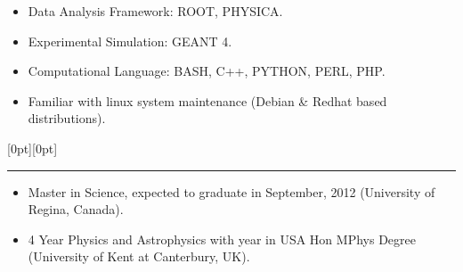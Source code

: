 \documentclass[a4paper,12pt]{letter}
\begin{document}
% 

\begin{itemize}
\item \textrm{\normalsize Data Analysis Framework: ROOT, PHYSICA.}
\item \textrm{\normalsize Experimental Simulation: GEANT 4.}
\item \textrm{\normalsize Computational Language: BASH, C++, PYTHON, PERL, PHP.}
\item \textrm{\normalsize Familiar with linux system maintenance (Debian \& Redhat based distributions).}
\end{itemize}

\secb


\pagebreak

\raisebox{0pt}[0pt][0pt]{\Large\textbf{\raisebox{-3.5ex}{Qualification}}} 
\\[2mm]
\rule[-0.5cm]{10cm}{1pt}
\begin{itemize}
\item \textrm{\normalsize Master in Science, expected to graduate in September, 2012 (University of Regina, Canada).}
\item \textrm{\normalsize 4 Year Physics and Astrophysics with year in USA Hon MPhys Degree (University of Kent at Canterbury, UK).}
\end{itemize}
\end{document}
